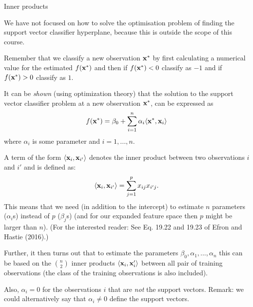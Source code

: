 \documentclass[ignorenonframetext,]{beamer}
\begin{document}
\begin{frame}

\begin{block}{Inner products}

We have not focused on how to solve the optimisation problem of finding
the support vector classifier hyperplane, because this is outside the
scope of this course.

Remember that we classify a new observation \({\bf x}^*\) by first
calculating a numerical value for the estimated \(f({\bf x}^*)\) and
then if \(f({\bf x}^*)<0\) classify as \(-1\) and if \(f({\bf x}^*)>0\)
classify as \(1\).

It can be \emph{shown} (using optimization theory) that the solution to
the support vector classifier problem at a new observation
\({\bf x}^*\), can be expressed as \[
f({\bf x}^*)=\beta_0 + \sum_{i=1}^n \alpha_i \langle {\bf x}^*,{\bf x}_i \rangle
\] where \(\alpha_i\) is some parameter and \(i=1,...,n\).

\end{block}

\end{frame}

\begin{frame}

A term of the form \(\langle {\bf x}_i, {\bf x}_{i'} \rangle\) denotes
the inner product between two observations \(i\) and \(i'\) and is
defined as: \[
\langle {\bf x}_i , {\bf x}_{i'}\rangle =\sum_{j=1}^p x_{ij} x_{i' j}.
\] This means that we need (in addition to the intercept) to estimate
\(n\) parameters (\(\alpha_i\)s) instead of \(p\) (\(\beta_j\)s) (and
for our expanded feature space then \(p\) might be larger than \(n\)).
(For the interested reader: See Eq. 19.22 and 19.23 of Efron and Hastie
(2016).)

\end{frame}

\begin{frame}

Further, it then turns out that to estimate the parameters
\(\beta_0,\alpha_1,...,\alpha_n\) this can be based on the
\({n}\choose{2}\) inner products \(\langle {\bf x}_i,{\bf x}_i'\rangle\)
between all pair of training observations (the class of the training
observations is also included).

Also, \(\alpha_i=0\) for the observations \(i\) that are \emph{not} the
support vectors. Remark: we could alternatively say that
\(\alpha_i \neq 0\) define the support vectors.

\end{frame}
\end{document}
